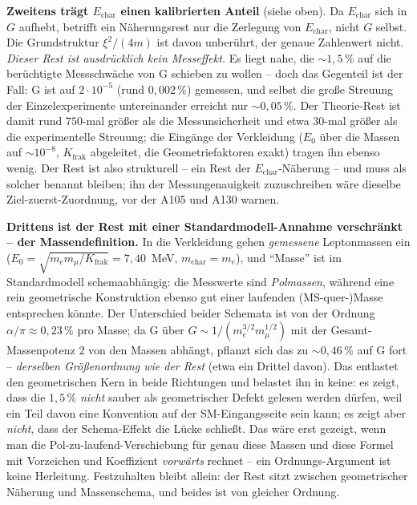 \textbf{Zweitens trägt $E_\text{char}$ einen kalibrierten Anteil} (siehe oben).
Da $E_\text{char}$ sich in $G$ aufhebt, betrifft ein Näherungsrest nur die Zerlegung von $E_\text{char}$, nicht $G$ selbst.
Die Grundstruktur $\xi^2/(4m)$ ist davon unberührt, der genaue Zahlenwert
nicht. \emph{Dieser Rest ist ausdrücklich kein Messeffekt.} Es liegt nahe, die
$\sim1{,}5\,\%$ auf die berüchtigte Messschwäche von G schieben zu wollen -- doch
das Gegenteil ist der Fall: G ist auf $2\cdot10^{-5}$ (rund $0{,}002\,\%$)
gemessen, und selbst die große Streuung der Einzelexperimente untereinander
erreicht nur $\sim0{,}05\,\%$. Der Theorie-Rest ist damit rund $750$-mal größer
als die Messunsicherheit und etwa $30$-mal größer als die experimentelle
Streuung; die Eingänge der Verkleidung ($E_0$ über die Massen auf $\sim10^{-8}$,
$K_\text{frak}$ abgeleitet, die Geometriefaktoren exakt) tragen ihn ebenso wenig.
Der Rest ist also strukturell -- ein Rest der $E_\text{char}$-Näherung -- und
muss als solcher benannt bleiben; ihn der Messungenauigkeit zuzuschreiben wäre
dieselbe Ziel-zuerst-Zuordnung, vor der A105 und A130 warnen.

\textbf{Drittens ist der Rest mit einer Standardmodell-Annahme verschränkt --
der Massendefinition.} In die Verkleidung gehen \emph{gemessene} Leptonmassen
ein ($E_0=\sqrt{m_e m_\mu/K_\text{frak}}=7{,}40$~MeV, $m_\text{char}=m_e$), und \enquote{Masse} ist im
Standardmodell schemaabhängig: die Messwerte sind \emph{Polmassen}, während eine
rein geometrische Konstruktion ebenso gut einer laufenden (MS-quer-)Masse
entsprechen könnte. Der Unterschied beider Schemata ist von der Ordnung
$\alpha/\pi \approx 0{,}23\,\%$ pro Masse; da G über
$G\sim 1/(m_e^{3/2} m_\mu^{1/2})$ mit der Gesamt-Massenpotenz $2$ von den Massen
abhängt, pflanzt sich das zu $\sim 0{,}46\,\%$ auf G fort -- \emph{derselben
Größenordnung wie der Rest} (etwa ein Drittel davon). Das entlastet den geometrischen Kern in beide
Richtungen und belastet ihn in keine: es zeigt, dass die $1{,}5\,\%$
\emph{nicht} sauber als geometrischer Defekt gelesen werden dürfen, weil ein Teil
davon eine Konvention auf der SM-Eingangsseite sein kann; es zeigt aber
\emph{nicht}, dass der Schema-Effekt die Lücke schließt. Das wäre erst gezeigt,
wenn man die Pol-zu-laufend-Verschiebung für genau diese Massen und diese Formel
mit Vorzeichen und Koeffizient \emph{vorwärts} rechnet -- ein Ordnungs-Argument
ist keine Herleitung. Festzuhalten bleibt allein: der Rest sitzt zwischen
geometrischer Näherung und Massenschema, und beides ist von gleicher Ordnung.

